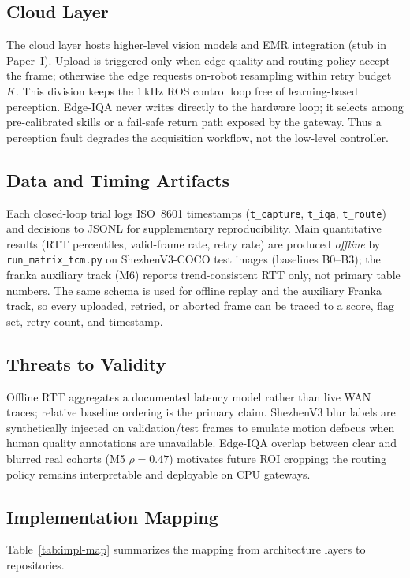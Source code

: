\subsection{Cloud Layer}
The cloud layer hosts higher-level vision models and EMR integration (stub in Paper~I).
Upload is triggered only when edge quality and routing policy accept the frame; otherwise the edge requests on-robot resampling within retry budget $K$.
This division keeps the 1\,kHz ROS control loop free of learning-based perception.
Edge-IQA never writes directly to the hardware loop; it selects among pre-calibrated skills or a fail-safe return path exposed by the gateway.
Thus a perception fault degrades the acquisition workflow, not the low-level controller.

\subsection{Data and Timing Artifacts}
Each closed-loop trial logs ISO~8601 timestamps (\texttt{t\_capture}, \texttt{t\_iqa}, \texttt{t\_route}) and decisions to JSONL for supplementary reproducibility.
Main quantitative results (RTT percentiles, valid-frame rate, retry rate) are produced \emph{offline} by \texttt{run\_matrix\_tcm.py} on ShezhenV3-COCO test images (baselines B0--B3); the franka auxiliary track (M6) reports trend-consistent RTT only, not primary table numbers.
The same schema is used for offline replay and the auxiliary Franka track, so every uploaded, retried, or aborted frame can be traced to a score, flag set, retry count, and timestamp.

\subsection{Threats to Validity}
Offline RTT aggregates a documented latency model rather than live WAN traces; relative baseline ordering is the primary claim.
ShezhenV3 blur labels are synthetically injected on validation/test frames to emulate motion defocus when human quality annotations are unavailable.
Edge-IQA overlap between clear and blurred real cohorts (M5 $\rho{=}0.47$) motivates future ROI cropping; the routing policy remains interpretable and deployable on CPU gateways.

\subsection{Implementation Mapping}
Table~\ref{tab:impl-map} summarizes the mapping from architecture layers to repositories.

